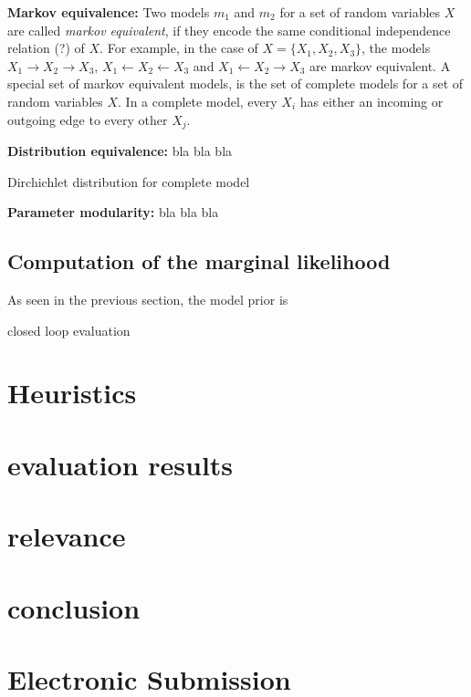 \documentclass{article}
\begin{document}
	\textbf{Markov equivalence:}
	Two models $m_1$ and $m_2$ for a set of random variables $X$ are called \textit{markov equivalent},
	if they encode the same conditional independence relation (?) of $X$. For example, in the case of
	$X=\{X_1,X_2,X_3\}$, the models $X_1 \rightarrow X_2 \rightarrow X_3$,
	$X_1 \leftarrow X_2 \leftarrow X_3$ and $X_1 \leftarrow X_2 \rightarrow X_3$ are 
	markov equivalent. A special set of markov equivalent models, is the set of
	complete models for a set of random variables $X$. In a complete model, every $X_i$ has either an
	incoming or outgoing edge to every other $X_j$.
	
	\textbf{Distribution equivalence:}
	bla bla bla
	
	Dirchichlet distribution for complete model
	
	\textbf{Parameter modularity:}
	bla bla bla
	
	\subsection{Computation of the marginal likelihood}
	As seen in the previous section, the model prior is 
	
	closed loop evaluation 
	
	

\section{Heuristics}
\section{evaluation results}

\section{relevance}

\section{conclusion}







\section{Electronic Submission}
\label{submission}
\end{document}
